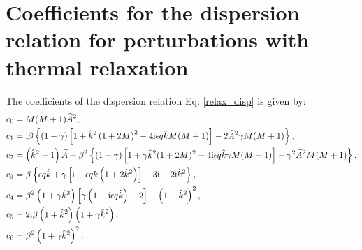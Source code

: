 
\section{Coefficients for the dispersion relation for perturbations
with thermal relaxation}\label{relax_coeff}
The coefficients of the dispersion relation Eq. \ref{relax_disp} is
given by:
\begin{align}
  &c_0 = M(M+1)\widetilde{A}^2,\\
  &c_1 = \mathrm{i}\beta\left\{\left(1-\gamma\right)\left[1 +
      \hat{k}^2\left(1+2M\right)^2 - 4 \mathrm{i}\epsilon q\hat{k} M (M+1)\right] 
    - 2\widetilde{A}^2\gamma M (M+1)\right\},\\
  &c_2 = \left(\hat{k}^2 + 1\right)\widetilde{A} + \beta^2\left\{(1-\gamma)\left[1
      + \gamma \hat{k}^2(1+2M)^2 - 4\mathrm{i}\epsilon q \hat{k} \gamma M(M+1)
    \right]
    -\gamma^2 \widetilde{A}^2 M(M+1)
  \right\},\\
  &c_3 = \beta\left\{\epsilon q \hat{k} + \gamma \left[\mathrm{i} + \epsilon q
      k \left(1+2\hat{k}^2\right)\right] - 3\mathrm{i} - 2\mathrm{i}
    \hat{k}^2\right\},\\
  &c_4 =
  \beta^2\left(1+\gamma\hat{k}^2\right)\left[\gamma\left(1-\mathrm{i}\epsilon q
    \hat{k}\right)-2\right] - \left(1+\hat{k}^2\right)^2,\\
&c_5 = 2\mathrm{i}\beta\left(1+\hat{k}^2\right)\left(1+\gamma\hat{k}^2\right),\\
&c_6 = \beta^2\left(1+\gamma\hat{k}^2\right)^2.
\end{align}

